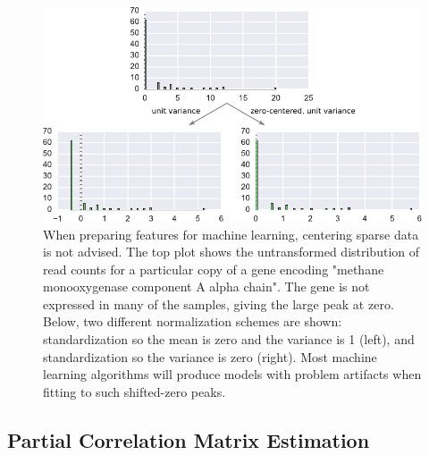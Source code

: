 \begin{figure}[H]
\centering
    \includegraphics[width=1.0\textwidth]{./tex/chapter3/figures/170324_standard_scalar.pdf}
    \begin{singlespace}
    \caption[Feature scaling: centering sparse features is not advised]{
        When preparing features for machine learning, centering sparse data is not advised.
        The top plot shows the untransformed distribution of read counts for a particular copy of a gene encoding
            "methane monooxygenase component A alpha chain".
        The gene is not expressed in many of the samples, giving the large peak at zero.
        Below, two different normalization schemes are shown:
            standardization so the mean is zero and the variance is 1 (left), and
            standardization so the variance is zero (right).
        Most machine learning algorithms will produce models with problem artifacts when fitting to such shifted-zero peaks.
        }
    \label{fig:standard_scaler}
    \end{singlespace}
\end{figure}

\subsection{Partial Correlation Matrix Estimation}


